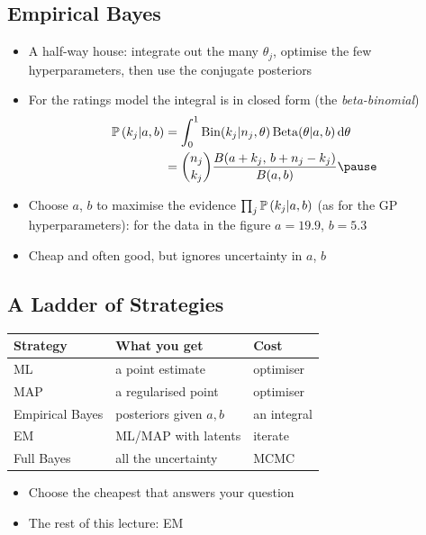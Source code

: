 \begin{slide}
\section[-2]{Empirical Bayes}

\begin{PauseHighLight}
  \begin{itemize}\squeeze
  \item A half-way house: integrate out the many $\theta_j$, optimise
    the few hyperparameters, then use the conjugate posteriors\pause
  \item For the ratings model the integral is in closed form (the
    \emph{beta-binomial})
    \begin{align*}
      \Prob{k_j|a,b} &= \int_0^1 \mathrm{Bin}(k_j|n_j,\theta)\,
      \mathrm{Beta}(\theta|a,b)\,\dd\theta \\
      &= \binom{n_j}{k_j}\frac{B(a+k_j,\,b+n_j-k_j)}{B(a,b)}\pause
    \end{align*}
  \item Choose $a$, $b$ to maximise the evidence
    $\prod_j\mathbb{P}\left( k_j|a,b \right)$ (as for the GP hyperparameters)\pause{}:
    for the data in the figure $a=19.9$, $b=5.3$\pauseb
  \item Cheap and often good, but ignores uncertainty in $a$, $b$\pause
  \end{itemize}
\end{PauseHighLight}

\end{slide}


\begin{slide}
\section{A Ladder of Strategies}

\begin{PauseHighLight}
  \begin{center}
    \begin{tabular}{l|l|l}
      Strategy & What you get & Cost \\ \hline
      ML & a point estimate & optimiser\pause \\
      MAP & a regularised point & optimiser\pause \\
      Empirical Bayes & posteriors given $a,b$ & an integral\pause \\
      EM & ML/MAP with latents & iterate\pause \\
      Full Bayes & all the uncertainty & MCMC\pause
    \end{tabular}
  \end{center}
  \begin{itemize}
  \item Choose the cheapest that answers your question\pause
  \item The rest of this lecture: EM\pause
  \end{itemize}
\end{PauseHighLight}

\end{slide}

